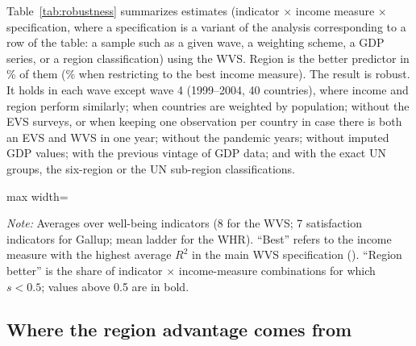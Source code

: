 \documentclass[12pt]{article}
\begin{document}
Table~\ref{tab:robustness} summarizes \nSpecsWVS estimates (indicator $\times$ income measure $\times$ specification, where a specification is a variant of the analysis corresponding to a row of the table: a sample such as a given wave, a weighting scheme, a GDP series, or a region classification)
using the WVS. Region is the better predictor in \shareRegionBetterWVS\% of them (\shareRegionBetterWVSbest\% when restricting to the best income measure). The result is robust. It holds in each wave except wave 4 (1999--2004, 40 countries), where income and region perform similarly; when countries are weighted by population; without the EVS surveys, or when keeping one observation per country in case there is both an EVS and WVS in one year; without the pandemic years; without imputed GDP values; with the previous vintage of GDP data; and with the exact UN groups, the six-region or the UN sub-region classifications.

\begin{table}[htbp]
    \centering
    \caption{Robustness: income vs.\ region across specifications and datasets.}\label{tab:robustness}
    \begin{adjustbox}{max width=\textwidth}
    
    \end{adjustbox}
    \begin{minipage}{\textwidth}\footnotesize \textit{Note:} Averages over well-being indicators (8 for the WVS; 7 satisfaction indicators for Gallup; mean ladder for the WHR). ``Best'' refers to the income measure with the highest average $R^2$ in the main WVS specification (\bestIncome). ``Region better'' is the share of indicator $\times$ income-measure combinations for which $s < 0.5$; values above 0.5 are in bold.\end{minipage}
\end{table}

\subsection{Where the region advantage comes from}\label{subsec:region_limits}
\end{document}
